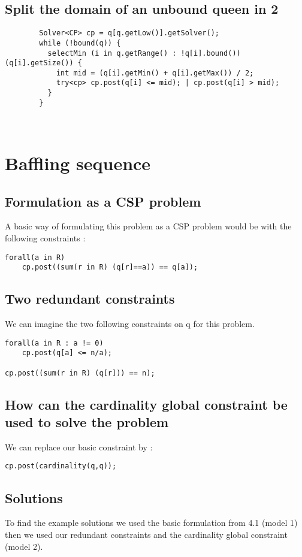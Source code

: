\documentclass{eplDoc}
\begin{document}
\subsection{Split the domain of an unbound queen in 2}      
\begin{lstlisting}
        Solver<CP> cp = q[q.getLow()].getSolver();
        while (!bound(q)) {
          selectMin (i in q.getRange() : !q[i].bound()) (q[i].getSize()) {
            int mid = (q[i].getMin() + q[i].getMax()) / 2;
            try<cp> cp.post(q[i] <= mid); | cp.post(q[i] > mid);
          }
        }
        
      
\end{lstlisting}

\section{Baffling sequence}


\subsection{Formulation as a CSP problem}
A basic way of formulating this problem as a CSP problem would be with the following constraints : 
\begin{lstlisting}
forall(a in R) 
    cp.post((sum(r in R) (q[r]==a)) == q[a]);
\end{lstlisting}

\subsection{Two redundant constraints}
We can imagine the two following constraints on q for this problem. 
\begin{lstlisting}
forall(a in R : a != 0) 
    cp.post(q[a] <= n/a);
  
cp.post((sum(r in R) (q[r])) == n);
\end{lstlisting}

\subsection{How can the cardinality global constraint be used to solve the problem}
We can replace our basic constraint by : 
\begin{lstlisting}
cp.post(cardinality(q,q));
\end{lstlisting}


\subsection{Solutions}
To find the example solutions we used the basic formulation from 4.1 (model 1) then we used our redundant constraints and the cardinality global constraint (model 2). 
\end{document}

